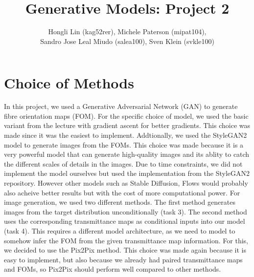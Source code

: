 \documentclass[12pt]{article}
\begin{document}
%
%

\title{Generative Models: Project 2} %
\author{Hongli Lin (kag52rer), Michele Paterson (mipat104),\\ Sandro Jose Leal Miudo (salea100), Sven Klein (svkle100)} %
\maketitle
\section{Choice of Methods}
In this project, we used a Generative Adversarial Network (GAN) to generate fibre orientation maps (FOM). For the specific choice of model, we used the basic variant from the lecture with gradient ascent for better gradients. This choice was made since it was the easiest to implement. Addtionally, we used the StyleGAN2 model to generate images from the FOMs. This choice was made because it is a very powerful model that can generate high-quality images and its ablity to catch the different scales of details in the images. Due to time constraints, we did not implement the model ourselves but used the implementation from the StyleGAN2 repository.
However other models such as Stable Diffusion, Flows would probably also acheive better results but with the cost of more computational power.
For image generation, we used two different methods. The first method generates images from the target distribution unconditionally (task 3). The second method uses the corresponding transmittance maps as conditional inputs into our model (task 4). This requires a different model architecture, as we need to model to somehow infer the FOM from the given transmittance map information. For this, we decided to use the Pix2Pix method. This choice was made again because it is easy to implement, but also because we already had paired transmittance maps and FOMs, so Pix2Pix should perform well compared to other methods.
\end{document}
